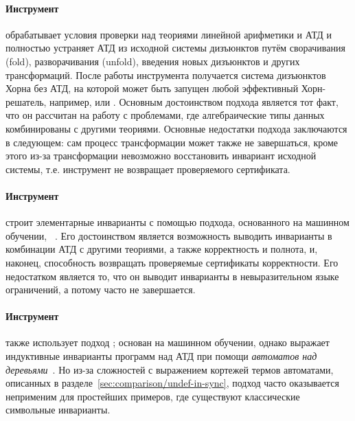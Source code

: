 \paragraph{Инструмент \vericat{}~\cite{10.1093/logcom/exab090,pettorossi_proietti_2022,10.1007/978-3-030-51074-9_6,angelis_fioravanti_pettorossi_proietti_2018}} обрабатывает условия проверки над теориями линейной арифметики и АТД и полностью устраняет АТД из исходной системы дизъюнктов путём сворачивания (fold), разворачивания (unfold), введения новых дизъюнктов и других трансформаций. После работы инструмента получается система дизъюнктов Хорна без АТД, на которой может быть запущен любой эффективный Хорн-решатель, например, \spacer{} или \eldarica{}. Основным достоинством подхода является тот факт, что он рассчитан на работу с проблемами, где алгебраические типы данных комбинированы с другими теориями. Основные недостатки подхода заключаются в следующем: сам процесс трансформации может также не завершаться, кроме этого из-за трансформации невозможно восстановить инвариант исходной системы, т.\:е. инструмент не возвращает проверяемого сертификата.

\paragraph{Инструмент \hoice{}~\cite{10.1007/978-3-030-02768-1_8}} строит элементарные инварианты с помощью подхода, основанного на машинном обучении, \ice{}~\cite{10.1007/978-3-319-08867-9_5}. Его достоинством является возможность выводить инварианты в комбинации АТД с другими теориями, а также корректность и полнота, и, наконец, способность возвращать проверяемые сертификаты корректности. Его недостатком является то, что он выводит инварианты в невыразительном языке ограничений, а потому часто не завершается.

\paragraph{Инструмент \rchc{}~\cite{haude2020,losekoot_et_al:LIPIcs.FSCD.2023.7}} также использует подход \ice{}; \rchc{} основан на машинном обучении, однако выражает индуктивные инварианты программ над АТД при помощи \emph{автоматов над деревьями}~\cite{tata}. Но из-за сложностей с выражением кортежей термов автоматами, описанных в разделе~\ref{sec:comparison/undef-in-sync}, подход часто оказывается неприменим для простейших примеров, где существуют классические символьные инварианты. 

